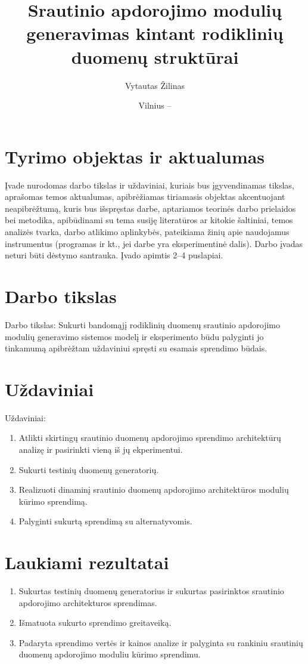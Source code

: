 \documentclass{VUMIFPSbakalaurinis}
\title{Srautinio apdorojimo modulių generavimas kintant rodiklinių duomenų struktūrai}
\author{Vytautas Žilinas}
\date{Vilnius – \the\year}
\begin{document}
 
\maketitle

\cleardoublepage{}
\setcounter{page}{2}

\section{Tyrimo objektas ir aktualumas}
Įvade nurodomas darbo tikslas ir uždaviniai, kuriais bus įgyvendinamas tikslas,
aprašomas temos aktualumas, apibrėžiamas tiriamasis objektas akcentuojant
neapibrėžtumą, kuris bus išspręstas darbe, aptariamos teorinės darbo prielaidos
bei metodika, apibūdinami su tema susiję literatūros ar kitokie šaltiniai,
temos analizės tvarka, darbo atlikimo aplinkybės, pateikiama žinių apie
naudojamus instrumentus (programas ir kt., jei darbe yra eksperimentinė dalis).
Darbo įvadas neturi būti dėstymo santrauka. Įvado apimtis 2–4 puslapiai.

\section{Darbo tikslas}
Darbo tikslas: Sukurti bandomąjį rodiklinių duomenų srautinio apdorojimo modulių 
generavimo sistemos modelį ir eksperimento būdu palyginti jo tinkamumą apibrėžtam 
uždaviniui spręsti su esamais sprendimo būdais.

\section{Uždaviniai}
Uždaviniai:
\begin{enumerate}
  \item Atlikti skirtingų srautinio duomenų apdorojimo sprendimo architektūrų analizę ir pasirinkti vieną iš jų ekperimentui.
  \item Sukurti testinių duomenų generatorių.
  \item Realizuoti dinaminį srautinio duomenų apdorojimo architektūros modulių kūrimo sprendimą.
	\item Palyginti sukurtą sprendimą su alternatyvomis.
\end{enumerate}

\section{Laukiami rezultatai}
    \begin{enumerate}
        \item Sukurtas testinių duomenų generatorius ir sukurtas pasirinktos srautinio apdorojimo architekturos sprendimas.
        \item Išmatuota sukurto sprendimo greitaveiką.
        \item Padaryta sprendimo vertės ir kainos analize ir palyginta su rankiniu srautinių duomenų apdorojimo moduliu kūrimo sprendimu. 
    \end{enumerate}
    \vspace{1 mm}
\end{document}
